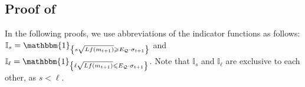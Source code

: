\documentclass[journal]{IEEEtran}
\providecommand{\E}{\mathbb{E}} %
\providecommand{\ind}[1]{\ensuremath{\mathbbm{1}_{\left\{#1\right\}}}} %
\renewcommand{\geq}{\geqslant} %
\renewcommand{\leq}{\leqslant} %
\DeclarePairedDelimiter{\norm}{\lVert}{\rVert}
\theoremstyle{definition}
\newcommand{\inds}{\mathbb{I}_{s}}
\newcommand{\indl}{\mathbb{I}_{\ell}}
\begin{document}



\subsection{Proof of }\label{apdx:lemma:potential_decrease}

In the following proofs, we use abbreviations of the indicator functions as follows:
$\inds = \ind{s\sqrt{ Lf(m_{t+1})} \geq  E_\mathcal{Q}\cdot \sigma_{t+1}}$ and $\indl = \ind{\ell \sqrt{ L f(m_{t+1})} \leq E_\mathcal{Q} \cdot \sigma_{t+1}}$.
Note that $\inds$ and $\indl$ are exclusive to each other, as $s<\ell$.
\end{document}
